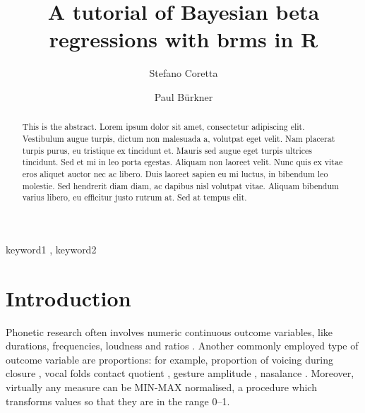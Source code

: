 \documentclass[
  authoryear,
  preprint,
  3p]{elsarticle}
\begin{document}
\begin{frontmatter}
\title{A tutorial of Bayesian beta regressions with brms in R}
\author[1]{Stefano Coretta%
%
}
\author[]{Paul Bürkner%
%
}



        
\begin{abstract}
This is the abstract. Lorem ipsum dolor sit amet, consectetur adipiscing
elit. Vestibulum augue turpis, dictum non malesuada a, volutpat eget
velit. Nam placerat turpis purus, eu tristique ex tincidunt et. Mauris
sed augue eget turpis ultrices tincidunt. Sed et mi in leo porta
egestas. Aliquam non laoreet velit. Nunc quis ex vitae eros aliquet
auctor nec ac libero. Duis laoreet sapien eu mi luctus, in bibendum leo
molestie. Sed hendrerit diam diam, ac dapibus nisl volutpat vitae.
Aliquam bibendum varius libero, eu efficitur justo rutrum at. Sed at
tempus elit.
\end{abstract}





\begin{keyword}
    keyword1 \sep 
    keyword2
\end{keyword}
\end{frontmatter}
    

\section{Introduction}\label{introduction}

Phonetic research often involves numeric continuous outcome variables,
like durations, frequencies, loudness and ratios
\citep{kluender1988, johnson2003, gick2013, ladefoged2014, abramson2017, roettger2018, coretta2023}.
Another commonly employed type of outcome variable are proportions: for
example, proportion of voicing during closure \citep{davidson2016},
vocal folds contact quotient \citep{herbst2017}, gesture amplitude
\citep{carignan2021}, nasalance \citep{carignan2021}. Moreover,
virtually any measure can be MIN-MAX normalised, a procedure which
transforms values so that they are in the range 0--1.
\end{document}
